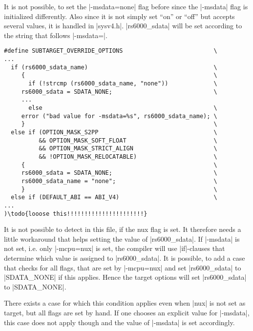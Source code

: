 It is not possible, to set the |-msdata=none| flag before since the |-msdata| flag is initialized differently.
Also since it is not simply set ``on'' or ``off'' but accepts several values, it is handled in |sysv4.h|.
|rs6000_sdata| will be set according to the string that follows |-msdata=|.
\begin{lstlisting}
#define SUBTARGET_OVERRIDE_OPTIONS                          \
...
  if (rs6000_sdata_name)                                    \
     {                                                      \
       if (!strcmp (rs6000_sdata_name, "none"))             \
     rs6000_sdata = SDATA_NONE;                             \
     ...
       else                                                 \
     error ("bad value for -msdata=%s", rs6000_sdata_name); \
     }                                                      \
  else if (OPTION_MASK_S2PP                                 \
          && OPTION_MASK_SOFT_FLOAT                         \
          && OPTION_MASK_STRICT_ALIGN                       \
          && !OPTION_MASK_RELOCATABLE)                      \
     {                                                      \
     rs6000_sdata = SDATA_NONE;                             \
     rs6000_sdata_name = "none";                            \
     }                                                      \
  else if (DEFAULT_ABI == ABI_V4)                           \
...
)\todo{looose this!!!!!!!!!!!!!!!!!!!!!!}
\end{lstlisting}

It is not possible to detect in this file, if the nux flag is set.
It therefore needs a little workaround that helps setting the value of |rs6000_sdata|.
If |-msdata| is not set, i.e. only |-mcpu=nux| is set, the compiler will use |if|-clauses that determine which value is assigned to |rs6000_sdata|.
It is possible, to add a case that checks for all flags, that are set by |-mcpu=nux| and set |rs6000_sdata| to |SDATA_NONE| if this applies.
Hence the target options will set |rs6000_sdata| to |SDATA_NONE|.

There exists a case for which this condition applies even when |nux| is not set as target, but all flags are set by hand.
If one chooses an explicit value for |-msdata|, this case does not apply though and the value of |-msdata| is set accordingly.

